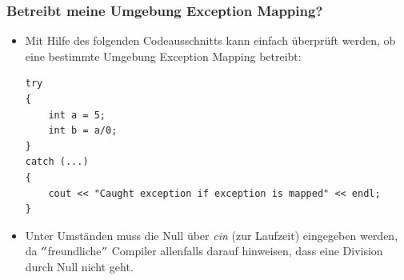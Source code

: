 \subsubsection{Betreibt meine Umgebung Exception Mapping?}
\begin{itemize}
	\item Mit Hilfe des folgenden Codeausschnitts kann einfach überprüft werden, ob eine bestimmte Umgebung Exception Mapping betreibt:
	\begin{minipage}{\linewidth}
	\vspace{-\baselineskip}
\begin{lstlisting}
try
{
	int a = 5;
	int b = a/0;
}
catch (...)
{
	cout << "Caught exception if exception is mapped" << endl;
}
\end{lstlisting}
	\end{minipage}
	\item Unter Umständen muss die Null über \emph{cin} (zur Laufzeit) eingegeben werden, da $"$freundliche$"$ Compiler allenfalls darauf hinweisen, dass eine Division durch Null nicht geht.
\end{itemize}